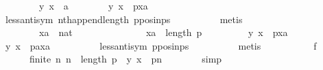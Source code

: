 \begin{isabellebody}
\ \ \ \ \ \ \ \ {\isachardoublequoteopen}{\isacharparenleft}{\kern0pt}y{\isacharcomma}{\kern0pt}\ x{\isacharparenright}{\kern0pt}\ {\isasymnotin}\ a{\isachardoublequoteclose}\isanewline
\ \ \ \ \ \ \isamarkupfalse%
\ {\isachardoublequoteopen}{\isacharparenleft}{\kern0pt}y{\isacharcomma}{\kern0pt}\ x{\isacharparenright}{\kern0pt}\ {\isasymin}\ p{\isacharbang}{\kern0pt}xa{\isachardoublequoteclose}\isanewline
\ \ \ \ \ \ \ \ \isamarkupfalse%
\ less{\isacharunderscore}{\kern0pt}antisym\ nth{\isacharunderscore}{\kern0pt}append{\isacharunderscore}{\kern0pt}length\ p{\isacharunderscore}{\kern0pt}pos{\isacharunderscore}{\kern0pt}in{\isacharunderscore}{\kern0pt}ps\isanewline
\ \ \ \ \ \ \ \ \isamarkupfalse%
\ metis\isanewline
\ \ \ \ \isamarkupfalse%
\isanewline
\ \ \ \ \ \ \isamarkupfalse%
\isanewline
\ \ \ \ \ \ \ \ xa\ {\isacharcolon}{\kern0pt}{\isacharcolon}{\kern0pt}\ nat\isanewline
\ \ \ \ \ \ \isamarkupfalse%
\isanewline
\ \ \ \ \ \ \ \ {\isachardoublequoteopen}xa\ {\isacharless}{\kern0pt}\ length\ p{\isachardoublequoteclose}\ \isanewline
\ \ \ \ \ \ \ \ {\isachardoublequoteopen}{\isacharparenleft}{\kern0pt}y{\isacharcomma}{\kern0pt}\ x{\isacharparenright}{\kern0pt}\ {\isasymin}\ p{\isacharbang}{\kern0pt}xa{\isachardoublequoteclose}\isanewline
\ \ \ \ \ \ \isamarkupfalse%
\ {\isachardoublequoteopen}{\isacharparenleft}{\kern0pt}y{\isacharcomma}{\kern0pt}\ x{\isacharparenright}{\kern0pt}\ {\isasymin}\ {\isacharparenleft}{\kern0pt}p{\isacharat}{\kern0pt}{\isacharbrackleft}{\kern0pt}a{\isacharbrackright}{\kern0pt}{\isacharparenright}{\kern0pt}{\isacharbang}{\kern0pt}xa{\isachardoublequoteclose}\isanewline
\ \ \ \ \ \ \ \ \isamarkupfalse%
\ less{\isacharunderscore}{\kern0pt}antisym\ p{\isacharunderscore}{\kern0pt}pos{\isacharunderscore}{\kern0pt}in{\isacharunderscore}{\kern0pt}ps\isanewline
\ \ \ \ \ \ \ \ \isamarkupfalse%
\ metis\isanewline
\ \ \ \ \isamarkupfalse%
\isanewline
\ \ \ \ \isamarkupfalse%
\ f{}{\isacharcolon}{\kern0pt}\isanewline
\ \ \ \ \ \ {\isachardoublequoteopen}finite\ {\isacharbraceleft}{\kern0pt}n{\isachardot}{\kern0pt}\ n\ {\isacharless}{\kern0pt}\ length\ p\ {\isasymand}\ {\isacharparenleft}{\kern0pt}y{\isacharcomma}{\kern0pt}\ x{\isacharparenright}{\kern0pt}\ {\isasymin}\ p{\isacharbang}{\kern0pt}n{\isacharbraceright}{\kern0pt}{\isachardoublequoteclose}\isanewline
\ \ \ \ \ \ \isamarkupfalse%
\ simp\isanewline
\ \ \ \ \isamarkupfalse%

\end{isabellebody}
